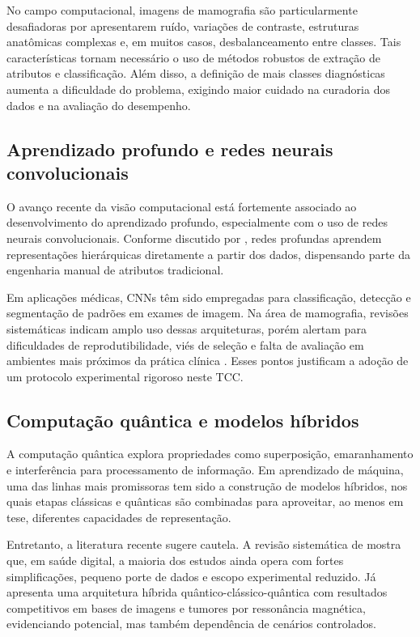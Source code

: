 \documentclass[
    12pt,
    openright,
    oneside,
    a4paper,
    english,
    brazil
]{abntex2}
\begin{document}
No campo computacional, imagens de mamografia são particularmente desafiadoras por apresentarem ruído, variações de contraste, estruturas anatômicas complexas e, em muitos casos, desbalanceamento entre classes. Tais características tornam necessário o uso de métodos robustos de extração de atributos e classificação. Além disso, a definição de mais classes diagnósticas aumenta a dificuldade do problema, exigindo maior cuidado na curadoria dos dados e na avaliação do desempenho.

\subsection{Aprendizado profundo e redes neurais convolucionais}

O avanço recente da visão computacional está fortemente associado ao desenvolvimento do aprendizado profundo, especialmente com o uso de redes neurais convolucionais. Conforme discutido por , redes profundas aprendem representações hierárquicas diretamente a partir dos dados, dispensando parte da engenharia manual de atributos tradicional.

Em aplicações médicas, CNNs têm sido empregadas para classificação, detecção e segmentação de padrões em exames de imagem. Na área de mamografia, revisões sistemáticas indicam amplo uso dessas arquiteturas, porém alertam para dificuldades de reprodutibilidade, viés de seleção e falta de avaliação em ambientes mais próximos da prática clínica \cite{Bhalla2023MammographyReview}. Esses pontos justificam a adoção de um protocolo experimental rigoroso neste TCC.

\subsection{Computação quântica e modelos híbridos}

A computação quântica explora propriedades como superposição, emaranhamento e interferência para processamento de informação. Em aprendizado de máquina, uma das linhas mais promissoras tem sido a construção de modelos híbridos, nos quais etapas clássicas e quânticas são combinadas para aproveitar, ao menos em tese, diferentes capacidades de representação.

Entretanto, a literatura recente sugere cautela. A revisão sistemática de  mostra que, em saúde digital, a maioria dos estudos ainda opera com fortes simplificações, pequeno porte de dados e escopo experimental reduzido. Já  apresenta uma arquitetura híbrida quântico-clássico-quântica com resultados competitivos em bases de imagens e tumores por ressonância magnética, evidenciando potencial, mas também dependência de cenários controlados.
\end{document}
